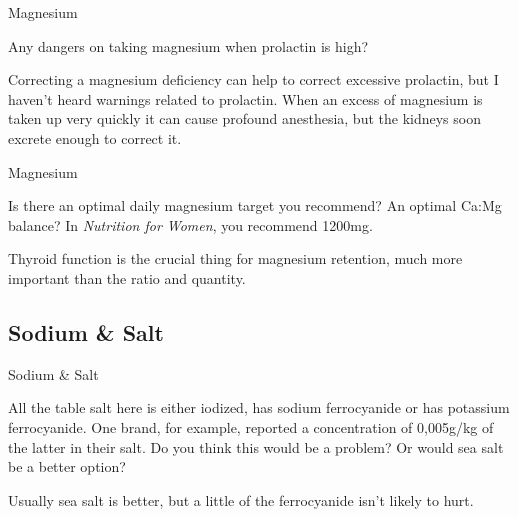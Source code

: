 \documentclass[11pt,oneside,openany,extrafontsizes]{memoir}
\begin{document}
\begin{qaexchange}{Magnesium}

    \begin{question}
        Any dangers on taking magnesium when prolactin is high?
    \end{question}

    \begin{answer}
       Correcting a magnesium deficiency can help to correct excessive prolactin, but I haven't heard warnings related to prolactin. When an excess of magnesium is taken up very quickly it can cause profound anesthesia, but the kidneys soon excrete enough to correct it. 
    \end{answer}
\end{qaexchange}

\begin{qaexchange}{Magnesium}

    \begin{question}
        Is there an optimal daily magnesium target you recommend? An optimal Ca:Mg balance? In \textit{Nutrition for Women}, you recommend 1200mg.
    \end{question}

    \begin{answer}
      Thyroid function is the crucial thing for magnesium retention, much more important than the ratio and quantity.
    \end{answer}
\end{qaexchange}

\subsection{Sodium \& Salt}

\begin{qaexchange}{Sodium \& Salt}

    \begin{question}
        All the table salt here is either iodized, has sodium ferrocyanide or has potassium ferrocyanide. One brand, for example, reported a concentration of 0,005g/kg of the latter in their salt. Do you think this would be a problem? Or would sea salt be a better option?
    \end{question}

    \begin{answer}
      Usually sea salt is better, but a little of the ferrocyanide isn't likely to hurt.
    \end{answer}
\end{qaexchange}
\end{document}
